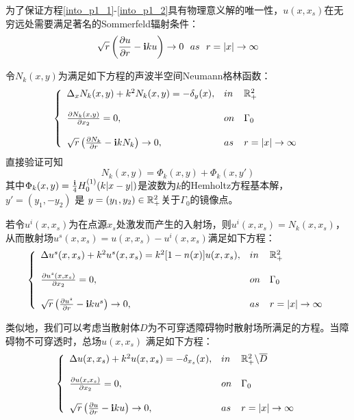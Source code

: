为了保证方程\eqref{into_p1_1}-\eqref{into_p1_2}具有物理意义解的唯一性，$u(x,x_s)$在无穷远处需要满足著名的Sommerfeld辐射条件：
\begin{equation}\label{into_p1_3}
  \sqrt{r}\left(\frac{\partial u}{\partial r}-\i k u\right)\rightarrow0\ \ as\ \ r=|x|\rightarrow\infty
\end{equation}

令$N_k(x,y)$为满足如下方程的声波半空间Neumann格林函数：
\begin{eqnarray}
\left\{
\begin{array}{lll}
 \Delta_x N_k(x,y)+k^2N_k(x,y)=-\delta_{y}(x),&in&\mathbb{R}^2_+   \label{into_p2_1}\\
 & &\\
 \frac{\partial N_k(x,y)}{\partial x_2}=0,&on&\Gamma_0  \label{into_p2_2}\\
 & &\\
 \sqrt{r}\left(\frac{\partial N_k}{\partial r}-\mathbf{i} k N_k\right)\rightarrow0,&as&r=|x|\rightarrow\infty\label{into_p2_3}
\end{array}
\right.
\end{eqnarray}
直接验证可知
\begin{equation}
  N_k(x,y)=\Phi_{k}(x,y)+\Phi_{k}(x,y')
\end{equation}
其中$\Phi_k(x,y)=\frac{\mathbf{i}}{4}H_0^{(1)}(k|x-y|)$是波数为$k$的Hemholtz方程基本解，$y'=(y_1,-y_2)$ 是 $y=(y_1,y_2)\in\mathbb{R}^2_+$关于$\Gamma_0$的镜像点。


若令$u^i(x,x_s)$为在点源$x_s$处激发而产生的入射场，则$u^i(x,x_s)=N_k(x,x_s)$，从而散射场$u^s(x,x_s)=u(x,x_s)-u^i(x,x_s)$满足如下方程：
\begin{eqnarray}\label{half_scatter}
\left\{
\begin{array}{lll}
 \Delta u^s(x,x_s)+k^2u^s(x,x_s)=k^2[1-n(x)]u(x,x_s),&in&\mathbb{R}^2_+   \label{into_p3_1}\\
 & &\\
 \frac{\partial u^s(x,x_s)}{\partial x_2}=0,&on&\Gamma_0  \label{into_p3_2}\\
 & &\\
 \sqrt{r}\left(\frac{\partial u^s}{\partial r}-\mathbf{i} k u^s\right)\rightarrow0,&as&r=|x|\rightarrow\infty\label{into_p3_3}
\end{array}
\right.
\end{eqnarray}

类似地，我们可以考虑当散射体$D$为不可穿透障碍物时散射场所满足的方程。当障碍物不可穿透时，总场$u(x,x_s)$ 满足如下方程：
\begin{eqnarray}
\left\{
\begin{array}{lll}
 \Delta u(x,x_s)+k^2u(x,x_s)=-\delta_{x_s}(x),&in&\mathbb{R}^2_+\backslash\overline{D}   \label{into_p4_1}\\
 & &\\
 \frac{\partial u(x,x_s)}{\partial x_2}=0,&on&\Gamma_0  \label{into_p4_2}\\
 & &\\
 \sqrt{r}\left(\frac{\partial u}{\partial r}-\mathbf{i} k u\right)\rightarrow0,&as& r=|x|\rightarrow\infty\label{into_p4_3}
\end{array}
\right.
\end{eqnarray}

